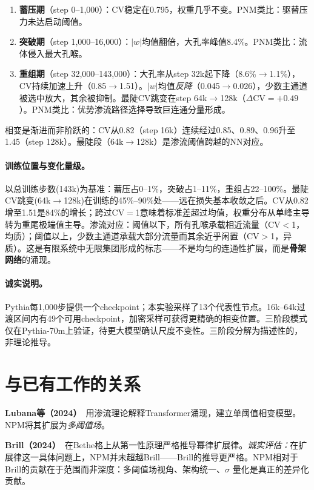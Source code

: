 \documentclass[11pt,a4paper]{article}
\begin{document}
\begin{enumerate}[nosep]
\item \textbf{蓄压期}（step 0--1,000）：CV稳定在0.795，权重几乎不变。PNM类比：驱替压力未达启动阈值。
\item \textbf{突破期}（step 1,000--16,000）：$|w|$均值翻倍，大孔率峰值8.4\%。PNM类比：流体侵入最大孔喉。
\item \textbf{重组期}（step 32,000--143,000）：大孔率从step 32k起下降（8.6\%$\to$1.1\%），CV持续加速上升（0.85$\to$1.51）。$|w|$均值\emph{反降}（0.045$\to$0.026），少数主通道被选中放大，其余被抑制。最陡CV跳变在step 64k$\to$128k（$\Delta$CV$=+0.49$）。PNM类比：优势渗流路径选择导致巨连通分量形成。
\end{enumerate}

相变是渐进而非阶跃的：CV从0.82（step 16k）连续经过0.85、0.89、0.96升至1.45（step 128k）。最陡段（64k$\to$128k）是渗流阈值跨越的NN对应。

\paragraph{训练位置与变化量级。}
以总训练步数(143k)为基准：蓄压占0--1\%，突破占1--11\%，重组占22--100\%。最陡CV跳变(64k$\to$128k)在训练的45\%--90\%处——远在损失基本收敛之后。CV从0.82增至1.51是84\%的增长；跨过CV$=$1意味着标准差超过均值，权重分布从单峰主导转为重尾极端值主导。渗流对应：阈值以下，所有孔喉承载相近流量（CV$<$1，均质）；阈值以上，少数主通道承载大部分流量而其余近乎闲置（CV$>$1，异质）。这是有限系统中无限集团形成的标志——不是均匀的连通性扩展，而是\textbf{骨架网络}的涌现。

\paragraph{诚实说明。}
Pythia每1,000步提供一个checkpoint；本实验采样了13个代表性节点。16k--64k过渡区间内有49个可用checkpoint，加密采样可获得更精确的相变位置。三阶段模式仅在Pythia-70m上验证，待更大模型确认尺度不变性。三阶段分解为描述性的，非理论推导。

\section{与已有工作的关系}

\textbf{Lubana等（2024）}~\citep{lubana2024percolation}用渗流理论解释Transformer涌现，建立单阈值相变模型。NPM将其扩展为\emph{多阈值场}。

\textbf{Brill（2024）}~\citep{brill2024scaling}在Bethe格上从第一性原理严格推导幂律扩展律。\emph{诚实评估：}在扩展律这一具体问题上，NPM并未超越Brill——Brill的推导更严格。NPM相对于Brill的贡献在于范围而非深度：多阈值场视角、架构统一、$\sigma$ 量化是真正的差异化贡献。
\end{document}

